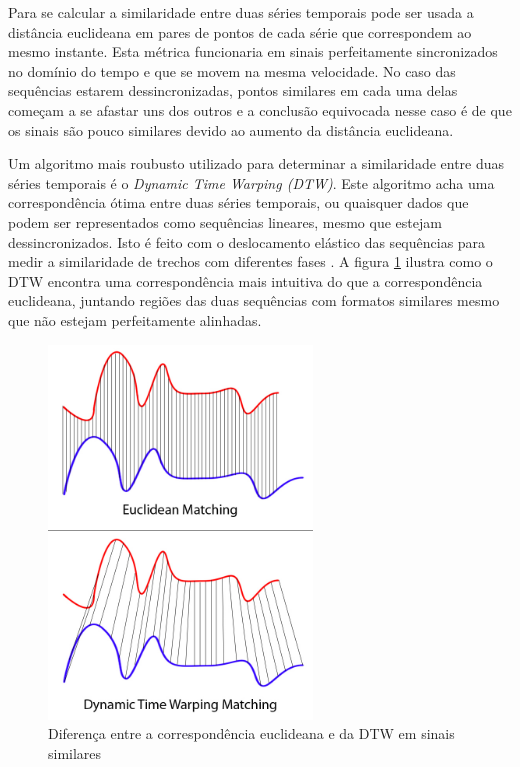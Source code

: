 Para se calcular a similaridade entre duas séries temporais pode ser usada a distância euclideana em pares de pontos de cada série que correspondem ao mesmo instante. Esta métrica funcionaria em sinais perfeitamente sincronizados no domínio do tempo e que se movem na mesma velocidade. No caso das sequências estarem dessincronizadas, pontos similares em cada uma delas começam a se afastar uns dos outros e a conclusão equivocada nesse caso é de que os sinais são pouco similares devido ao aumento da distância euclideana.

Um algoritmo mais roubusto utilizado para determinar a similaridade entre duas séries temporais é o \textit{Dynamic Time Warping (DTW)}. Este algoritmo acha uma correspondência ótima entre duas séries temporais, ou quaisquer dados que podem ser representados como sequências lineares, mesmo que estejam dessincronizados. Isto é feito com o deslocamento elástico das sequências para medir a similaridade de trechos com diferentes fases \citep{shou2005fast}. A figura \ref{fig:euclidean-vs-dtw-matching} ilustra como o DTW encontra uma correspondência mais intuitiva do que a correspondência euclideana, juntando regiões das duas sequências com formatos similares mesmo que não estejam perfeitamente alinhadas.

\begin{figure}[htb]
\centering
\includegraphics[width=7cm]{figuras/Euclidean_vs_DTW.jpg}
\caption{Diferença entre a correspondência euclideana e da DTW em sinais similares \citep{dtwmatching}}
\label{fig:euclidean-vs-dtw-matching}
\end{figure}

